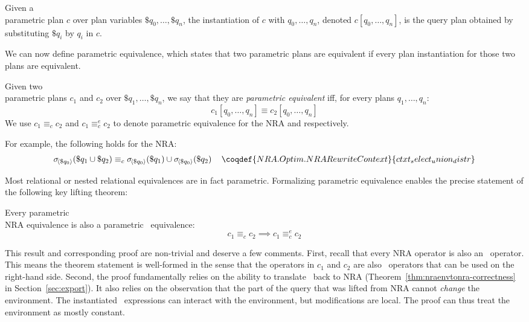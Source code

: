 \begin{definition}
  Given a \\ parametric plan $c$ over plan variables
  $\$q_0,\ldots,\$q_n$, the instantiation of $c$ with
  $q_0,\ldots,q_n$, denoted $c[q_0,\ldots,q_n]$, is the query plan
  obtained by substituting $\$q_i$ by $q_i$ in $c$.
\end{definition}

We can now define parametric equivalence, which states that two
parametric plans are equivalent if every plan instantiation for those
two plans are equivalent.

\begin{definition}
  Given two \\ parametric plans $c_1$ and $c_2$ over
  $\$q_1,\ldots,\$q_n$, we say that they are \textit{parametric
    equivalent} iff, for every plans $q_1,\ldots,q_n$:
  \[ c_1[q_0,\ldots,q_n] \equiv c_2[q_0,\ldots,q_n] \]
  We use $c_1 \equiv_c c_2$ and $c_1 \equiv^e_c c_2$ to denote
  parametric equivalence for the NRA and \NRAEnv respectively.
\end{definition}

For example,  the following holds for the NRA:
\[ \qselect{\$q_0}{\$q_1\cup\$q_2} \equiv_c
\qselect{\$q_0}{\$q_1}\cup\qselect{\$q_0}{\$q_2}\quad \coqdef{NRA.Optim.NRARewriteContext}{ctxt_select_union_distr} \]

Most relational or nested relational equivalences are in fact
parametric. Formalizing parametric equivalence
enables the precise statement of the following key lifting theorem:

\begin{theorem}
  \label{thm:lifting}
  Every parametric \\ NRA equivalence is also a parametric \NRAEnv\ equivalence:
  \[ c_1 \equiv_c c_2 \implies c_1 \equiv^e_c c_2 \]
\end{theorem}

This result and corresponding proof are non-trivial and deserve a few
comments. First, recall that every NRA operator is also an \NRAEnv\
operator. This means the theorem statement is well-formed in the sense
that the operators in $c_1$ and $c_2$ are also \NRAEnv\ operators that
can be used on the right-hand side. Second, the proof fundamentally
relies on the ability to translate \NRAEnv\ back to NRA
(Theorem~\ref{thm:nraenvtonra-correctness} in
Section~\ref{sec:export}). It also relies on the observation that the
part of the query that was lifted from NRA cannot \emph{change} the
environment.  The instantiated \NRAEnv\ expressions can interact with
the environment, but modifications are local.  The proof can thus
treat the environment as mostly constant.

